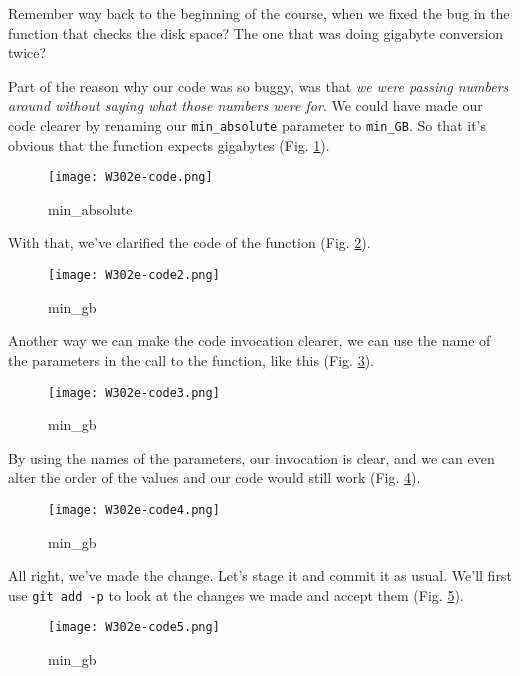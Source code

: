 	Remember way back to the beginning of the course, when we fixed the bug in the function that checks the disk space? The one that was doing gigabyte conversion twice?
	
	Part of the reason why our code was so buggy, was that \textit{we were passing numbers around without saying what those numbers were for}. We could have made our code clearer by renaming our \verb|min_absolute| parameter to \verb|min_GB|. So that it's obvious that the function expects gigabytes (Fig. \ref{W302e-code}).
	
	\begin{figure} 
		\caption{min\_absolute}
		\centering
		\texttt{[image: W302e-code.png]}
		\label{W302e-code}
	\end{figure}
	
	With that, we've clarified the code of the function (Fig. \ref{W302e-code2}). 
	
	\begin{figure} 
		\caption{min\_gb}
		\centering
		\texttt{[image: W302e-code2.png]}
		\label{W302e-code2}
	\end{figure}
	
	Another way we can make the code invocation clearer, we can use the name of the parameters in the call to the function, like this (Fig. \ref{W302e-code3}).
	
	\begin{figure} 
		\caption{min\_gb}
		\centering
		\texttt{[image: W302e-code3.png]}
		\label{W302e-code3}
	\end{figure}
	
	By using the names of the parameters, our invocation is clear, and we can even alter the order of the values and our code would still work (Fig. \ref{W302e-code4}).
	
	\begin{figure} 
		\caption{min\_gb}
		\centering
		\texttt{[image: W302e-code4.png]}
		\label{W302e-code4}
	\end{figure}
	
	
	All right, we've made the change. Let's stage it and commit it as usual. We'll first use \verb|git add -p| to look at the changes we made and accept them (Fig. \ref{W302e-code5}).
	
	\begin{figure} 
		\caption{min\_gb}
		\centering
		\texttt{[image: W302e-code5.png]}
		\label{W302e-code5}
	\end{figure}
	
